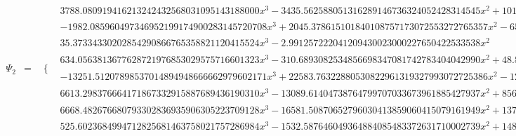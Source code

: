\documentclass{article}
\begin{document}
\begin{landscape}
\begin{eqnarray*}
\begin{array}{cc}
\end{array}\\
\Psi_2 & = & \begin{array}{cc}
 \{ & 
\begin{array}{cc}
 3788.080919416213242432568031095143188000 x^3-3435.562588051316289146736324052428314545 x^2+1019.918284363360683652722154559733017715 x-99.21048960327238460719965475827435082844 & x\geq \frac{1}{4}\land x<\frac{3}{8} \\
 -1982.085960497346952199174900283145720708 x^3+2045.378615101840108757173072553272765357 x^2-656.4984655379734076649433437193271588502 x+62.97457897425693207047096684559845519251 & x\geq \frac{3}{8}\land x<\frac{1}{2} \\
 35.37334330202854290866765358821120415524 x^3-2.991257222041209430023000227650422533538 x^2 & x\geq 0\land x<\frac{1}{8} \\
 634.0563813677628721976853029575716601323 x^3-310.6893082534856698347081742783404042990 x^2+48.86124534852981841574859119848372406743 x-2.469176429922044970037980651692966683924 & x\geq \frac{1}{8}\land x<\frac{1}{4} \\
 -13251.51207898537014894948666662979602171 x^3+22583.76322880530822961319327993072725386 x^2-12742.81349037542413095822972633679392160 x+2380.214202778118163096898077103299502067 & x\geq \frac{1}{2}\land x<\frac{5}{8} \\
 6613.298376664171867332915887689436190310 x^3-13089.61404738764799707033673961885427937 x^2+8569.833352151464102065242304757332746471 x-1855.084315437127425313463964557068180823 & x\geq \frac{5}{8}\land x<\frac{3}{4} \\
 6668.482676680793302836935906305223709128 x^3-16581.50870652796030413859060415079161949 x^2+13714.55183458388389025458932014109731865 x-3772.713308064528761832839872649212215641 & x\geq \frac{3}{4}\land x<\frac{7}{8} \\
 525.6023684994712825681463758021757286984 x^3-1532.587646049364884085483372631710002739 x^2+1488.368186600315920466527617856892819383 x-481.3829090504223189491906210273585453425 & x\geq \frac{7}{8}\land x<1
\end{array}


\end{array}
\end{eqnarray*}
\end{landscape}
\end{document}
